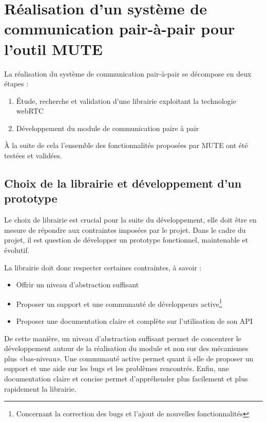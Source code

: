 \documentclass{tnreport}
\begin{document}
\section{Réalisation d'un système de communication pair-à-pair pour l'outil MUTE}

La réalisation du système de communication pair-à-pair se décompose en deux étapes :

\begin{enumerate}
  \item Étude, recherche et validation d'une librairie exploitant la technologie webRTC
  \item Développement du module de communication paire à pair
\end{enumerate}

À la suite de cela l'ensemble des fonctionnalités proposées par MUTE ont été testées et validées. 

\subsection{Choix de la librairie et développement d'un prototype}

Le choix de librairie est crucial pour la suite du développement, elle doit être en mesure de répondre aux contraintes imposées par le projet. Dans le cadre du projet, il est question de développer un prototype fonctionnel, maintenable et évolutif. 

La librairie doit donc respecter certaines contraintes, à savoir :

\begin{itemize}
  \item Offrir un niveau d'abstraction suffisant
  \item Proposer un support et une communauté de développeurs active\footnote{Concernant la correction des bugs et l'ajout de nouvelles fonctionnalités}
  \item Proposer une documentation claire et complète sur l'utilisation de son API
\end{itemize}

De cette manière, un niveau d'abstraction suffisant permet de concentrer le développement autour de la réalisation du module et non sur des mécanismes plus «bas-niveau». Une communauté active permet quant à elle de proposer un support et une aide sur les bugs et les problèmes rencontrés. Enfin, une documentation claire et concise permet d'appréhender plus facilement et plus rapidement la librairie.
\end{document}

